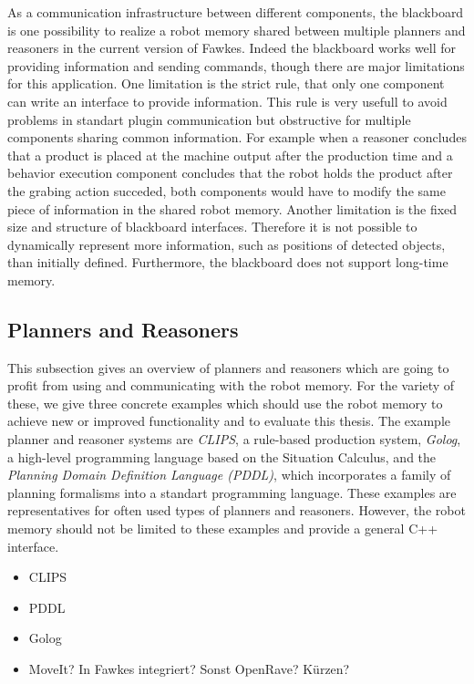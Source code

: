 \documentclass[a4paper,11pt]{article}
\begin{document}
As a communication infrastructure between different components, the
blackboard is one possibility to realize a robot memory shared between
multiple planners and reasoners in the current version of
Fawkes. Indeed the blackboard works well for providing information and
sending commands, though there are major limitations for this
application. One limitation is the strict rule, that only one
component can write an interface to provide information. This rule is
very usefull to avoid problems in standart plugin communication but
obstructive for multiple components sharing common information. For
example when a reasoner concludes that a product is placed at the
machine output after the production time and a behavior execution
component concludes that the robot holds the product after the grabing
action succeded, both components would have to modify the same piece
of information in the shared robot memory. Another limitation is the
fixed size and structure of blackboard interfaces. Therefore it is not
possible to dynamically represent more information, such as positions
of detected objects, than initially defined. Furthermore, the blackboard
does not support long-time memory.

\subsection{Planners and Reasoners}
This subsection gives an overview of planners and reasoners which are
going to profit from using and communicating with the robot
memory. For the variety of these, we give three concrete
examples which should use the robot memory to achieve new or improved
functionality and to evaluate this thesis. The example planner and
reasoner systems are \emph{CLIPS}, a rule-based production system,
\emph{Golog}, a high-level programming language based on the Situation
Calculus, and the \emph{Planning Domain Definition Language (PDDL)},
which incorporates a family of planning formalisms into a standart
programming language. These examples are representatives for often
used types of planners and reasoners. However, the robot memory should
not be limited to these examples and provide a general C++ interface.



\label{sec:planners}
\begin{itemize}
\item CLIPS
\item PDDL
\item Golog
\item MoveIt? In Fawkes integriert? Sonst OpenRave? Kürzen?
\end{itemize}
\end{document}
